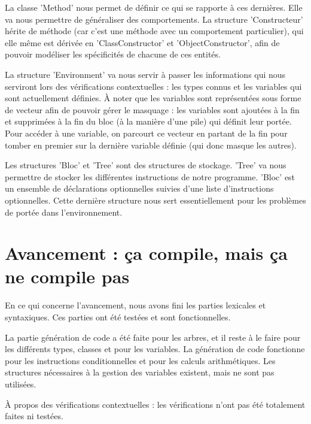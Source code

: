 \documentclass[12pt,a4paper]{article}
\begin{document}
La classe 'Method' nous permet de définir ce qui se rapporte à ces dernières. Elle va nous permettre de généraliser des comportements. La structure 'Constructeur' hérite de méthode (car c’est une méthode avec un comportement particulier), qui elle même est dérivée en 'ClassConstructor' et  'ObjectConstructor', afin de pouvoir modéliser les spécificités de chacune de ces entités.

La structure 'Environment' va nous servir à passer les informations qui nous serviront lors des vérifications contextuelles : les types connus et les variables qui sont actuellement définies. À noter que les variables sont représentées sous forme de vecteur afin de pouvoir gérer le masquage : les variables sont ajoutées à la fin et supprimées à la fin du bloc (à la manière d'une pile) qui définit leur portée. Pour accéder à une variable, on parcourt ce vecteur en partant de la fin pour tomber en premier sur la dernière variable définie (qui donc masque les autres).

Les structures 'Bloc' et 'Tree' sont des structures de stockage. 'Tree' va nous permettre de stocker les différentes instructions de notre programme. 'Bloc' est un ensemble de déclarations optionnelles suivies d’une liste d’instructions optionnelles. Cette dernière structure nous sert essentiellement pour les problèmes de portée dans l’environnement.

\section{Avancement : ça compile, mais ça ne compile pas}

En ce qui concerne l’avancement, nous avons fini les parties lexicales et syntaxiques. Ces parties ont été testées et sont fonctionnelles.

La partie génération de code a été faite pour les arbres, et il reste à le faire pour les différents types, classes et pour les variables. La génération de code fonctionne pour les instructions conditionnelles et pour les calculs arithmétiques. Les structures nécessaires à la gestion des variables existent, mais ne sont pas utilisées.

À propos des vérifications contextuelles : les vérifications n’ont pas été totalement faites ni testées. 
\end{document}
